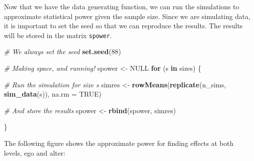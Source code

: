 \documentclass[]{book}
\newenvironment{Shaded}{\begin{snugshade}}{\end{snugshade}}
\newcommand{\CommentTok}[1]{\textcolor[rgb]{0.56,0.35,0.01}{\textit{#1}}}
\newcommand{\ControlFlowTok}[1]{\textcolor[rgb]{0.13,0.29,0.53}{\textbf{#1}}}
\newcommand{\DataTypeTok}[1]{\textcolor[rgb]{0.13,0.29,0.53}{#1}}
\newcommand{\DecValTok}[1]{\textcolor[rgb]{0.00,0.00,0.81}{#1}}
\newcommand{\KeywordTok}[1]{\textcolor[rgb]{0.13,0.29,0.53}{\textbf{#1}}}
\newcommand{\NormalTok}[1]{#1}
\newcommand{\OperatorTok}[1]{\textcolor[rgb]{0.81,0.36,0.00}{\textbf{#1}}}
\newcommand{\OtherTok}[1]{\textcolor[rgb]{0.56,0.35,0.01}{#1}}
\newcommand{\StringTok}[1]{\textcolor[rgb]{0.31,0.60,0.02}{#1}}
\begin{document}
\begin{Shaded}
\end{Shaded}

Now that we have the data generating function, we can run the simulations to approximate statistical power given the sample size. Since we are simulating data, it is important to set the seed so that we can reproduce the results. The results will be stored in the matrix \texttt{spower}.

\begin{Shaded}
\begin{Highlighting}[]
\CommentTok{# We always set the seed}
\KeywordTok{set.seed}\NormalTok{(}\DecValTok{88}\NormalTok{) }

\CommentTok{# Making space, and running!}
\NormalTok{spower <-}\StringTok{ }\OtherTok{NULL}
\ControlFlowTok{for}\NormalTok{ (s }\ControlFlowTok{in}\NormalTok{ sizes) \{}

  \CommentTok{# Run the simulation for size s}
\NormalTok{  simres <-}\StringTok{ }\KeywordTok{rowMeans}\NormalTok{(}\KeywordTok{replicate}\NormalTok{(n_sims, }\KeywordTok{sim_data}\NormalTok{(s)), }\DataTypeTok{na.rm =} \OtherTok{TRUE}\NormalTok{)}

  \CommentTok{# And store the results}
\NormalTok{  spower <-}\StringTok{ }\KeywordTok{rbind}\NormalTok{(spower, simres)}

\NormalTok{\}}
\end{Highlighting}
\end{Shaded}

The following figure shows the approximate power for finding effects at both levels, ego and alter:
\end{document}
